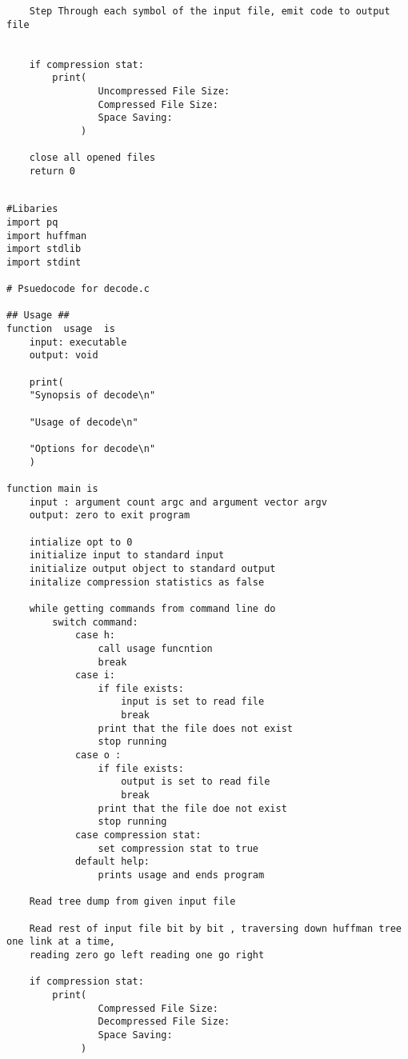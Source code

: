 \documentclass[11pt]{article} %
\begin{document}
\begin{flushleft}
\begin{lstlisting}
    Step Through each symbol of the input file, emit code to output file

    
    if compression stat:
        print(
                Uncompressed File Size:
                Compressed File Size:
                Space Saving:
             )
    
    close all opened files
    return 0
\end{lstlisting}

\begin{lstlisting}

#Libaries
import pq
import huffman
import stdlib
import stdint

# Psuedocode for decode.c

## Usage ##
function  usage  is
    input: executable
    output: void

    print(
    "Synopsis of decode\n"

    "Usage of decode\n"

    "Options for decode\n"
    )

function main is
    input : argument count argc and argument vector argv
    output: zero to exit program
    
    intialize opt to 0
    initialize input to standard input
    initialize output object to standard output
    initalize compression statistics as false

    while getting commands from command line do
        switch command:
            case h: 
                call usage funcntion
                break
            case i:
                if file exists:
                    input is set to read file
                    break
                print that the file does not exist
                stop running
            case o :
                if file exists:
                    output is set to read file 
                    break
                print that the file doe not exist
                stop running
            case compression stat:
                set compression stat to true
            default help:
                prints usage and ends program
    
    Read tree dump from given input file

    Read rest of input file bit by bit , traversing down huffman tree one link at a time,
    reading zero go left reading one go right

    if compression stat:
        print(
                Compressed File Size:
                Decompressed File Size:
                Space Saving:
             )
    

\end{lstlisting}
\end{flushleft}
\end{document}
